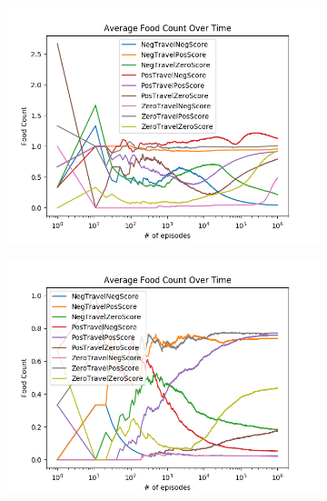 \documentclass[result.tex]{subfiles}
\begin{document}
    \begin{figure}[ht]
        \centering
        \begin{subfigure}[b]{.35\linewidth}
            \includegraphics[width=\linewidth]{../images/qlearning/reward/234/board_state_average_food_count_over_time.png}
        \end{subfigure}
        \begin{subfigure}[b]{.35\linewidth}
            \includegraphics[width=\linewidth]{../images/qlearning/reward/234/directional_distance_state_average_food_count_over_time.png}
        \end{subfigure}


\end{figure}
\end{document}
